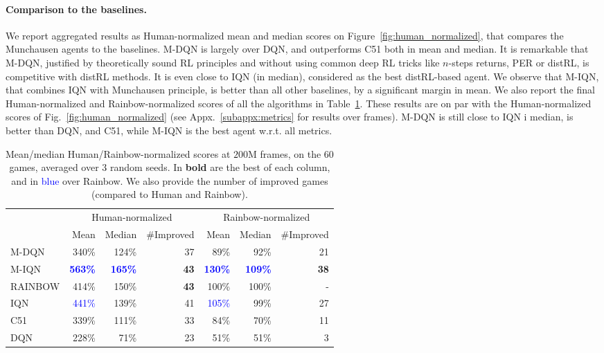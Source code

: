 \documentclass{article}
\begin{document}
\paragraph{Comparison to the baselines.}

We report aggregated results as Human-normalized mean and median scores on Figure~\ref{fig:human_normalized}, that compares the Munchausen agents to the baselines.
M-DQN is largely over DQN, and outperforms C51 both in mean and median. It is remarkable that M-DQN, justified by theoretically sound RL principles and without using common deep RL tricks like $n$-steps returns, PER or distRL, is competitive with distRL methods. It is even close to IQN (in median), considered as the best distRL-based agent. We observe that M-IQN, that combines IQN with Munchausen principle, is better than all other baselines, by a significant margin in mean.
We also report the final Human-normalized and Rainbow-normalized scores of all the algorithms in Table~\ref{tab:score_summary}.
These results are on par with the Human-normalized scores of Fig.~\ref{fig:human_normalized} (see Appx.~\ref{subappx:metrics} for results over frames). M-DQN is still close to IQN i median, is better than DQN, and C51, while M-IQN is the best agent w.r.t. all metrics.

 
 \begin{table}[]
     \centering
     \caption{Mean/median Human/Rainbow-normalized scores at $200$M frames, on the 60 games, averaged over $3$ random seeds. In \textbf{bold} are the best of each column, and in \textcolor{blue}{blue} over Rainbow.
     We also provide the number of improved games (compared to Human and Rainbow).
     }\begin{tabular}{l r r r r r r}
\toprule
& \multicolumn{3}{c}{Human-normalized} & \multicolumn{3}{c}{Rainbow-normalized}\\
\cmidrule(r){2-4} \cmidrule(r){5-7}
         & Mean & Median & \#Improved & Mean & Median & \#Improved\\
\midrule
M-DQN & 340\% & 124\% & 37 & 89\% & 92\%& 21 \\
M-IQN & \textbf{\textcolor{blue}{563\%}} & \textbf{\textcolor{blue}{165\%}} & \textbf{43} &\textbf{\textcolor{blue}{130\%}} & \textbf{\textcolor{blue}{109\%}} & \textbf{38}\\ \hdashline
RAINBOW & 414\% & 150\% & \textbf{43} &100\% &100\% & - \\
IQN & \textcolor{blue}{441\%} & 139\% & 41 &\textcolor{blue}{105\%} & 99\% & 27\\
C51 & 339\% & 111\% & 33 & 84\% & 70\% & 11 \\
DQN & 228\% & 71\% & 23 & 51\%  & 51\% & 3\\
\bottomrule
     \end{tabular}
     \label{tab:score_summary}
 \end{table}
\end{document}
